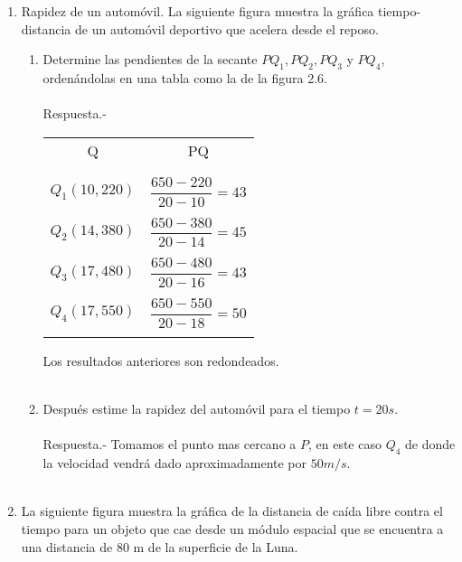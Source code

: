 \begin{enumerate}
\item Rapidez de un automóvil. La siguiente figura muestra la gráfica tiempo-distancia de un automóvil deportivo que acelera desde el reposo.
\begin{enumerate}[\bfseries a)]

    \item Determine las pendientes de la secante $PQ_1, PQ_2, PQ_3$ y $PQ_4$, ordenándolas en una tabla como la de la figura 2.6.\\\\
	Respuesta.-\; 
	\begin{center}
	    \begin{tabular}{c|c}
		Q & PQ \\\\	
		\hline\\
		$Q_1(10,220)$ & $\dfrac{650-220}{20-10} = 43$\\\\
		$Q_2(14,380)$ & $\dfrac{650-380}{20-14} = 45$\\\\
		$Q_3(17,480)$ & $\dfrac{650-480}{20-16} = 43$\\\\
		$Q_4(17,550)$ & $\dfrac{650-550}{20-18} = 50$\\\\
	    \end{tabular}
	\end{center}
	Los resultados anteriores son redondeados.\\\\

    \item Después estime la rapidez del automóvil para el tiempo $t=20s$.\\\\
	Respuesta.-\; Tomamos el punto mas cercano a $P$, en este caso $Q_4$ de donde la velocidad vendrá dado aproximadamente por $50m/s$.\\\\

\end{enumerate}

\item La siguiente figura muestra la gráfica de la distancia de caída libre contra el tiempo para un objeto que cae desde un módulo espacial que se encuentra a una distancia de 80 m de la superficie de la Luna.
\begin{enumerate}[\bfseries a)]
    

\end{enumerate}
\end{enumerate}
